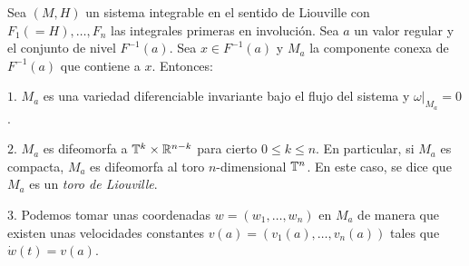 \begin{thm}\label{arnold}
  Sea $(M,H)$ un sistema integrable en el sentido de Liouville con $F_1(=H),\dots,F_n$ las integrales primeras en involución. Sea $a$ un valor regular y el conjunto de nivel $F^{-1}(a)$. Sea $x\in F^{-1}(a)$ y $M_a$ la componente conexa de $F^{-1}(a)$ que contiene a $x$.  Entonces:

$1$. $M_a$ es una variedad diferenciable invariante bajo el flujo del sistema y $\left. \omega \right|_{M_a}=0$.
  
$2$. $M_a$ es difeomorfa a $\mathbb{T}^k\times \mathbb{R}^{n-k}$ para cierto $0 \leq k \leq n$. En particular, si $M_a$ es compacta, $M_a$ es difeomorfa al toro $n$-dimensional $\mathbb{T}^n$. En este caso, se dice que $M_a$ es un \emph{toro de Liouville}. 
 
$3$. Podemos tomar unas coordenadas $w=(w_1,\dots, w_n)$ en $M_a$ de manera que existen unas velocidades constantes $v(a)=(v_1(a),\dots,v_n(a))$ tales que $\dot w (t)=v(a)$. 
\end{thm}

